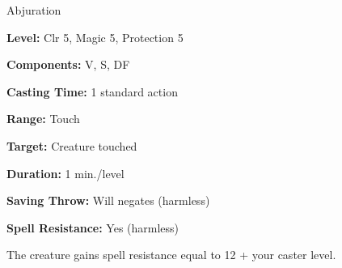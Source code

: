 
Abjuration

\textbf{Level:} Clr 5, Magic 5, Protection 5

\textbf{Components:} V, S, DF

\textbf{Casting Time:} 1 standard action

\textbf{Range:} Touch

\textbf{Target:} Creature touched

\textbf{Duration:} 1 min./level

\textbf{Saving Throw:} Will negates (harmless)

\textbf{Spell Resistance:} Yes (harmless)

The creature gains spell resistance equal to 12 + your caster level.

